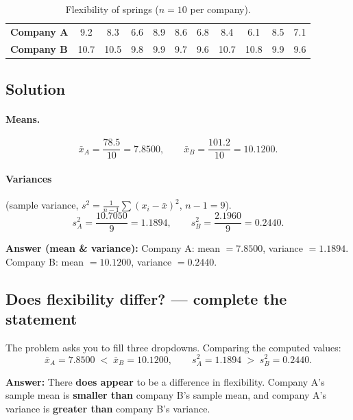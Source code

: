\documentclass[11pt]{article}
\begin{document}
\begin{table}[H]
\centering
\renewcommand{\arraystretch}{1.25}
\begin{tabular}{l *{10}{c}}
\toprule
\textbf{Company A} & 9.2 & 8.3 & 6.6 & 8.9 & 8.6 & 6.8 & 8.4 & 6.1 & 8.5 & 7.1 \\
\textbf{Company B} & 10.7 & 10.5 & 9.8 & 9.9 & 9.7 & 9.6 & 10.7 & 10.8 & 9.9 & 9.6 \\
\bottomrule
\end{tabular}
\caption{Flexibility of springs ($n=10$ per company).}
\end{table}

\subsection*{Solution}

\paragraph{Means.}
\[
\bar{x}_A=\frac{78.5}{10}=7.8500,\qquad \bar{x}_B=\frac{101.2}{10}=10.1200 .
\]

\paragraph{Variances} (sample variance, $s^2=\tfrac{1}{n-1}\sum (x_i-\bar{x})^2$, $n-1=9$).
\[
s_A^2=\frac{10.7050}{9}=1.1894,\qquad s_B^2=\frac{2.1960}{9}=0.2440 .
\]

\begin{answerbox}
\textbf{Answer (mean \& variance):}\quad
Company A: mean $=7.8500$, variance $=1.1894$.\\
Company B: mean $=10.1200$, variance $=0.2440$.
\end{answerbox}

\subsection*{Does flexibility differ? — complete the statement}

\noindent
The problem asks you to fill three dropdowns. Comparing the computed values:
\[
\bar{x}_A = 7.8500 \;<\; \bar{x}_B = 10.1200,
\qquad
s_A^2 = 1.1894 \;>\; s_B^2 = 0.2440 .
\]

\begin{answerbox}
\textbf{Answer:} There \textbf{does appear} to be a difference in flexibility.
Company A's sample mean is \textbf{smaller than} company B's sample mean, and
company A's variance is \textbf{greater than} company B's variance.
\end{answerbox}
\end{document}
